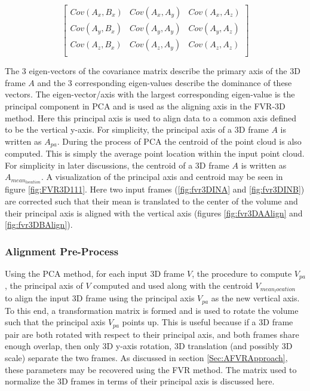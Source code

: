 \begin{equation} \label{eqn:CovarMatrix}
\left[
\begin{array}{ccc}
Cov(A_x, B_x) & Cov(A_x, A_y) & Cov(A_x, A_z) \\
Cov(A_y, B_x) & Cov(A_y, A_y) & Cov(A_y, A_z) \\
Cov(A_z, B_x) & Cov(A_z, A_y) & Cov(A_z, A_z) \\
\end{array}
\right]
\end{equation}

The 3 eigen-vectors of the covariance matrix describe the primary axis of the 3D frame $A$ and the 3 corresponding eigen-values describe the dominance of these vectors. The eigen-vector/axis with the largest corresponding eigen-value is the principal component in PCA and is used as the aligning axis in the FVR-3D method. Here this principal axis is used to align data to a common axis defined to be the vertical y-axis. For simplicity, the principal axis of a 3D frame $A$ is written as $A_{pa}$. During the process of PCA the centroid of the point cloud is also computed. This is simply the average point location within the input point cloud. For simplicity in later discussions, the centroid of a 3D frame $A$ is written as $A_{mean_{location}}$. A visualization of the principal axis and centroid may be seen in figure \ref{fig:FVR3D111}. Here two input frames (\ref{fig:fvr3DINA} and \ref{fig:fvr3DINB}) are corrected such that their mean is translated to the center of the volume and their principal axis is aligned with the vertical axis (figures \ref{fig:fvr3DAAlign} and \ref{fig:fvr3DBAlign}). \\

\subsubsection{Alignment Pre-Process}

Using the PCA method, for each input 3D frame $V$, the procedure to compute $V_{pa}$, the principal axis of $V$ computed and used along with the centroid $V_{mean_location}$ to align the input 3D frame using the principal axis $V_{pa}$ as the new vertical axis. To this end, a transformation matrix is formed and is used to rotate the volume such that the principal axis $V_{pa}$ points up. This is useful because if a 3D frame pair are both rotated with respect to their principal axis, and both frames share enough overlap, then only 3D y-axis rotation, 3D translation (and possibly 3D scale) separate the two frames. As discussed in section \ref{Sec:AFVRApproach}, these parameters may be recovered using the FVR method. The matrix used to normalize the 3D frames in terms of their principal axis is discussed here. \\

